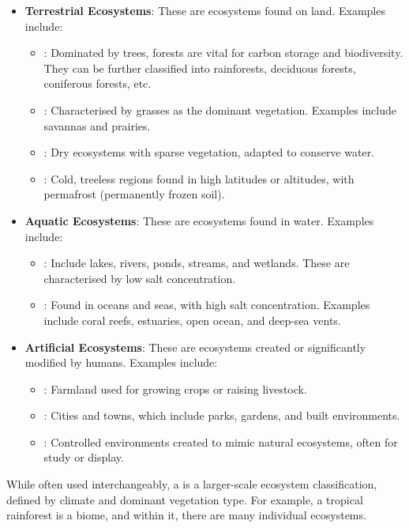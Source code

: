 \begin{itemize}
    \item \textbf{Terrestrial Ecosystems}: These are ecosystems found on land. Examples include:
    \begin{itemize}
        \item {}: Dominated by trees, forests are vital for carbon storage and biodiversity.  They can be further classified into rainforests, deciduous forests, coniferous forests, etc.
        \item {}: Characterised by grasses as the dominant vegetation.  Examples include savannas and prairies.
        \item {}:  Dry ecosystems with sparse vegetation, adapted to conserve water.
        \item {}: Cold, treeless regions found in high latitudes or altitudes, with permafrost (permanently frozen soil).
    \end{itemize}
    \item \textbf{Aquatic Ecosystems}: These are ecosystems found in water. Examples include:
    \begin{itemize}
        \item {}:  Include lakes, rivers, ponds, streams, and wetlands. These are characterised by low salt concentration.
        \item {}: Found in oceans and seas, with high salt concentration.  Examples include coral reefs, estuaries, open ocean, and deep-sea vents.
    \end{itemize}
    \item \textbf{Artificial Ecosystems}: These are ecosystems created or significantly modified by humans. Examples include:
    \begin{itemize}
        \item {}: Farmland used for growing crops or raising livestock.
        \item {}: Cities and towns, which include parks, gardens, and built environments.
        \item {}: Controlled environments created to mimic natural ecosystems, often for study or display.
    \end{itemize}
\end{itemize}

\begin{marginnote}
 While often used interchangeably, a  is a larger-scale ecosystem classification, defined by climate and dominant vegetation type.  For example, a tropical rainforest is a biome, and within it, there are many individual ecosystems.
\end{marginnote}

